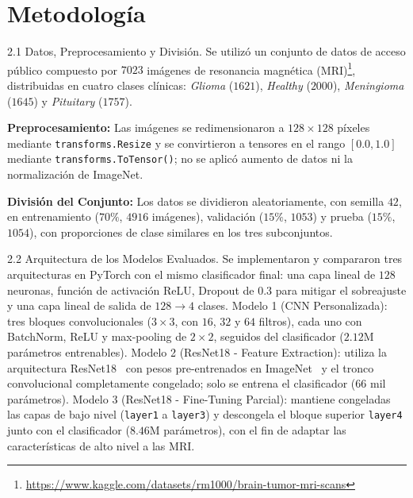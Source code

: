 \documentclass[letterpaper, 10 pt, conference]{ieeeconf}  %
\begin{document}
\section{Metodología}

2.1 Datos, Preprocesamiento y División.
Se utilizó un conjunto de datos de acceso público compuesto por $7023$ imágenes de resonancia magnética (MRI)\footnote{\url{https://www.kaggle.com/datasets/rm1000/brain-tumor-mri-scans}}, distribuidas en cuatro clases clínicas: \textit{Glioma} ($1621$), \textit{Healthy} ($2000$), \textit{Meningioma} ($1645$) y \textit{Pituitary} ($1757$).

\textbf{Preprocesamiento:} Las imágenes se redimensionaron a $128\times128$ píxeles mediante \texttt{transforms.Resize} y se convirtieron a tensores en el rango $[0.0, 1.0]$ mediante \texttt{transforms.ToTensor()}; no se aplicó aumento de datos ni la normalización de ImageNet.

\textbf{División del Conjunto:} Los datos se dividieron aleatoriamente, con semilla $42$, en entrenamiento ($70\%$, $4916$ imágenes), validación ($15\%$, $1053$) y prueba ($15\%$, $1054$), con proporciones de clase similares en los tres subconjuntos.

2.2 Arquitectura de los Modelos Evaluados.
Se implementaron y compararon tres arquitecturas en PyTorch con el mismo clasificador final: una capa lineal de $128$ neuronas, función de activación ReLU, Dropout de $0.3$ para mitigar el sobreajuste y una capa lineal de salida de $128 \to 4$ clases.
Modelo 1 (CNN Personalizada): tres bloques convolucionales ($3\times3$, con $16$, $32$ y $64$ filtros), cada uno con BatchNorm, ReLU y max-pooling de $2\times2$, seguidos del clasificador ($2.12$M parámetros entrenables).
Modelo 2 (ResNet18 - Feature Extraction): utiliza la arquitectura ResNet18~\cite{he2016} con pesos pre-entrenados en ImageNet~\cite{deng2009} y el tronco convolucional completamente congelado; solo se entrena el clasificador ($66$ mil parámetros).
Modelo 3 (ResNet18 - Fine-Tuning Parcial): mantiene congeladas las capas de bajo nivel (\texttt{layer1} a \texttt{layer3}) y descongela el bloque superior \texttt{layer4} junto con el clasificador ($8.46$M parámetros), con el fin de adaptar las características de alto nivel a las MRI.
\end{document}
